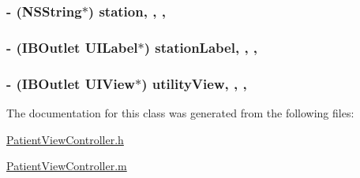 \subsubsection[{station}]{\setlength{\rightskip}{0pt plus 5cm}-\/ (N\+S\+String$\ast$) station\hspace{0.3cm}{\ttfamily [read]}, {\ttfamily [write]}, {\ttfamily [nonatomic]}, {\ttfamily [strong]}}\label{interface_patient_view_controller_a8f8b7d70361185915526eef8d0ae605b}
\hypertarget{interface_patient_view_controller_a22bfc7a8180b3ea86643917b4c772333}{}
\subsubsection[{station\+Label}]{\setlength{\rightskip}{0pt plus 5cm}-\/ (I\+B\+Outlet U\+I\+Label$\ast$) station\+Label\hspace{0.3cm}{\ttfamily [read]}, {\ttfamily [write]}, {\ttfamily [nonatomic]}, {\ttfamily [weak]}}\label{interface_patient_view_controller_a22bfc7a8180b3ea86643917b4c772333}
\hypertarget{interface_patient_view_controller_aef3bd4cf26a022b5b5cecb2976e72920}{}
\subsubsection[{utility\+View}]{\setlength{\rightskip}{0pt plus 5cm}-\/ (I\+B\+Outlet U\+I\+View$\ast$) utility\+View\hspace{0.3cm}{\ttfamily [read]}, {\ttfamily [write]}, {\ttfamily [nonatomic]}, {\ttfamily [weak]}}\label{interface_patient_view_controller_aef3bd4cf26a022b5b5cecb2976e72920}


The documentation for this class was generated from the following files\+:\begin{DoxyCompactItemize}
\item 
\hyperlink{_patient_view_controller_8h}{Patient\+View\+Controller.\+h}\item 
\hyperlink{_patient_view_controller_8m}{Patient\+View\+Controller.\+m}\end{DoxyCompactItemize}
